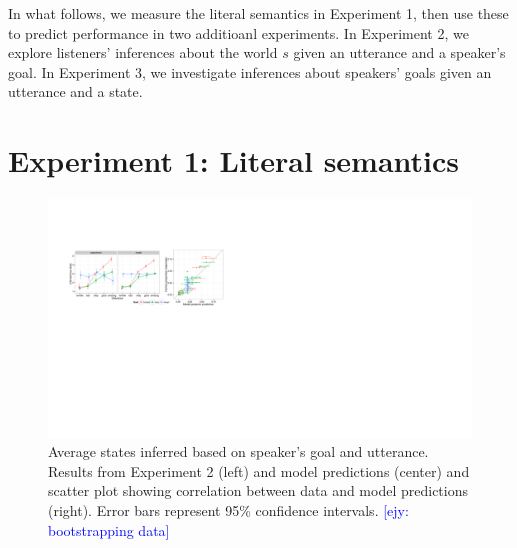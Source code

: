 \documentclass[10pt,letterpaper]{article}
\newcommand{\ejy}[1]{\textcolor{Blue}{[ejy: #1]}}
\begin{document}
In what follows, we measure the literal semantics in Experiment 1, then use these to predict performance in two additioanl experiments. In Experiment 2, we explore listeners' inferences about the world $s$ given an utterance and a speaker's goal. In Experiment 3, we investigate inferences about speakers' goals given an utterance and a state.


%



\section{Experiment 1: Literal semantics}



\begin{figure}[t]
\begin{centering}
\includegraphics[width=\textwidth]{figures/state-inference-wScatter.pdf}
\caption{\label{fig:exp3} Average states inferred based on speaker's goal and utterance. Results from Experiment 2 (left) and model predictions (center) and scatter plot showing correlation between data and model predictions (right). Error bars represent 95\% confidence intervals.  \ejy{bootstrapping data}}
\end{centering}
\end{figure}
\end{document}

